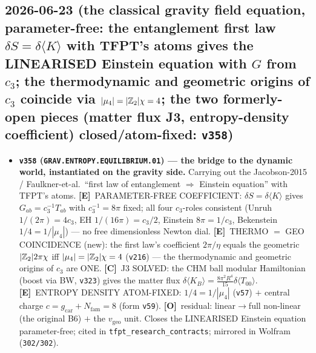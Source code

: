 \documentclass[11pt]{article}
\providecommand{\mE}{\textbf{[E]}}\providecommand{\mC}{\textbf{[C]}}
\providecommand{\mO}{\textbf{[O]}}\providecommand{\mX}{\textbf{[X]}}
\providecommand{\vref}[1]{\texttt{#1}}
\providecommand{\cthree}{c_3}\providecommand{\phiz}{\varphi_0^{\mathrm{ret}}}
\providecommand{\gcar}{g_{\mathrm{car}}}\providecommand{\Nfam}{N_{\mathrm{fam}}}
\begin{document}
\subsection*{2026-06-23 (the classical gravity field equation, parameter-free: the entanglement first law $\delta S=\delta\langle K\rangle$ with TFPT's atoms gives the LINEARISED Einstein equation with $G$ from $\cthree$; the thermodynamic and geometric origins of $\cthree$ coincide via $|\mu_4|=|\mathbb{Z}_2|\chi=4$; the two formerly-open pieces (matter flux J3, entropy-density coefficient) closed/atom-fixed: \texttt{v358})}
\begin{itemize}
\item \textbf{\texttt{v358} (\texttt{GRAV.ENTROPY.EQUILIBRIUM.01}) --- the bridge to the dynamic world, instantiated on the
gravity side.} Carrying out the Jacobson-2015 / Faulkner-et-al.\ ``first law of entanglement $\Rightarrow$ Einstein
equation'' with TFPT's atoms. \mE\ PARAMETER-FREE COEFFICIENT: $\delta S=\delta\langle K\rangle$ gives
$G_{ab}=\cthree^{-1}T_{ab}$ with $\cthree^{-1}=8\pi$ fixed; all four $\cthree$-roles consistent (Unruh
$1/(2\pi){=}4\cthree$, EH $1/(16\pi){=}\cthree/2$, Einstein $8\pi{=}1/\cthree$, Bekenstein $1/4{=}1/|\mu_4|$) ---
no free dimensionless Newton dial. \mE\ THERMO $=$ GEO COINCIDENCE (new): the first law's coefficient $2\pi/\eta$
equals the geometric $|\mathbb{Z}_2|2\pi\chi$ iff $|\mu_4|=|\mathbb{Z}_2|\chi=4$ (\vref{v216}) --- the thermodynamic and geometric
origins of $\cthree$ are ONE. \mC\ J3 SOLVED: the CHM ball modular Hamiltonian (boost via BW, \vref{v323}) gives the
matter flux $\delta\langle K_B\rangle=\tfrac{8\pi^2R^4}{15}\delta\langle T_{00}\rangle$. \mE\ ENTROPY DENSITY
ATOM-FIXED: $1/4{=}1/|\mu_4|$ (\vref{v57}) $+$ central charge $c=\gcar{+}\Nfam=8$ (form \vref{v59}). \mO\ residual:
linear$\to$full non-linear (the original B6) $+$ the $v_{\mathrm{geo}}$ unit. Closes the LINEARISED Einstein
equation parameter-free; cited in \texttt{tfpt\_research\_contracts}; mirrored in Wolfram (\texttt{302/302}).
\end{itemize}
\end{document}
